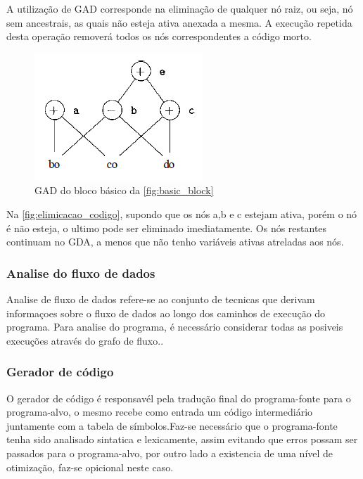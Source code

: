 \par
A utilização de GAD corresponde na eliminação de qualquer nó raiz, ou seja, nó sem ancestrais, as quais não esteja ativa anexada a mesma. A execução repetida desta operação removerá todos os nós correspondentes a código morto\cite{aho2007compilers}.

\begin{figure}[htb]
	\begin{center}
    \caption{\label{fig:elimicacao_codigo}GAD do bloco básico da \autoref{fig:basic_block}}
	\includegraphics[scale=0.70]{Figuras/eliminacao_codigo.png}
	\end{center}
\end{figure}

Na \autoref{fig:elimicacao_codigo}, supondo que os nós a,b e c estejam ativa, porém o nó é não esteja, o ultimo pode ser eliminado imediatamente. Os nós restantes continuam no GDA, a menos que não tenho variáveis ativas atreladas aos nós\cite{aho2007compilers}.
\subsubsection{Analise do fluxo de dados}
\par
Analise de fluxo de dados refere-se ao conjunto de tecnicas que derivam informaçoes sobre o fluxo de dados ao longo dos caminhos de execução do programa. Para analise do programa, é necessário considerar todas as posiveis execuções através do grafo de fluxo.\cite{aho2007compilers}.

\subsubsection{Gerador de código}
\par
O gerador de código é responsavél pela tradução final do programa-fonte para o programa-alvo, o mesmo recebe como entrada um código intermediário juntamente com a tabela de símbolos.Faz-se necessário que o programa-fonte tenha sido analisado sintatica e lexicamente, assim evitando que erros possam ser passados para o programa-alvo, por outro lado a existencia de uma nível de otimização, faz-se opicional neste caso\cite{aho2007compilers}.

